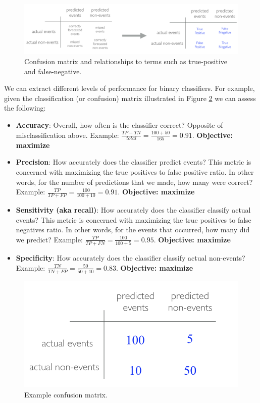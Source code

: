 \documentclass[]{krantz}
\begin{document}
\begin{figure}

{\centering \includegraphics[width=1\linewidth,height=1\textheight]{images/confusion-matrix} 

}

\caption{Confusion matrix and relationships to terms such as true-positive and false-negative.}\label{fig:confusion-matrix}
\end{figure}

We can extract different levels of performance for binary classifiers. For example, given the classification (or confusion) matrix illustrated in Figure \ref{fig:confusion-matrix2} we can assess the following:

\begin{itemize}
\item
  \textbf{Accuracy}: Overall, how often is the classifier correct? Opposite of misclassification above. Example: \(\frac{TP + TN}{total} = \frac{100+50}{165} = 0.91\). \textbf{Objective: maximize}
\item
  \textbf{Precision}: How accurately does the classifier predict events? This metric is concerned with maximizing the true positives to false positive ratio. In other words, for the number of predictions that we made, how many were correct? Example: \(\frac{TP}{TP + FP} = \frac{100}{100+10} = 0.91\). \textbf{Objective: maximize}
\item
  \textbf{Sensitivity (aka recall)}: How accurately does the classifier classify actual events? This metric is concerned with maximizing the true positives to false negatives ratio. In other words, for the events that occurred, how many did we predict? Example: \(\frac{TP}{TP + FN} = \frac{100}{100+5} = 0.95\). \textbf{Objective: maximize}
\item
  \textbf{Specificity}: How accurately does the classifier classify actual non-events? Example: \(\frac{TN}{TN + FP} = \frac{50}{50+10} = 0.83\). \textbf{Objective: maximize}
\end{itemize}

\begin{figure}

{\centering \includegraphics[width=0.5\linewidth,height=0.5\textheight]{images/confusion-matrix2} 

}

\caption{Example confusion matrix.}\label{fig:confusion-matrix2}
\end{figure}
\end{document}
